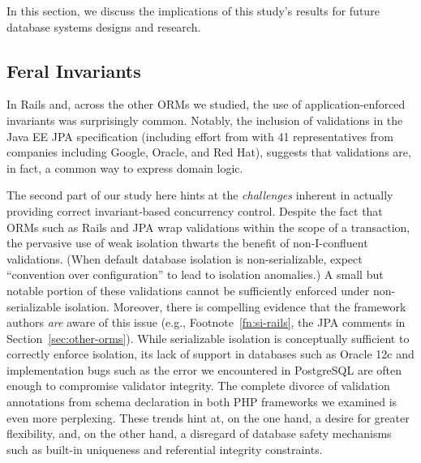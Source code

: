 In this section, we discuss the implications of this study's results
for future database systems designs and research.

\subsection{Feral Invariants}

In Rails and, across the other ORMs we studied, the use of
application-enforced invariants was surprisingly common. Notably, the
inclusion of validations in the Java EE JPA specification (including
effort from with 41 representatives from companies including Google,
Oracle, and Red Hat), suggests that validations are, in fact, a common
way to express domain logic.

The second part of our study here hints at the \textit{challenges}
inherent in actually providing correct invariant-based concurrency
control. Despite the fact that ORMs such as Rails and JPA wrap
validations within the scope of a transaction, the pervasive use of
weak isolation thwarts the benefit of non-I-confluent
validations. (When default database isolation is non-serializable,
expect ``convention over configuration'' to lead to isolation
anomalies.) A small but notable portion of these validations cannot be
sufficiently enforced under non-serializable isolation. Moreover,
there is compelling evidence that the framework authors \textit{are}
aware of this issue (e.g., Footnote~\ref{fn:si-rails}, the JPA
comments in Section~\ref{sec:other-orms}). While serializable
isolation is conceptually sufficient to correctly enforce isolation,
its lack of support in databases such as Oracle 12c and implementation
bugs such as the error we encountered in PostgreSQL are often enough
to compromise validator integrity. The complete divorce of validation
annotations from schema declaration in both PHP frameworks we examined
is even more perplexing. These trends hint at, on the one hand, a
desire for greater flexibility, and, on the other hand, a disregard of
database safety mechanisms such as built-in uniqueness and referential
integrity constraints.

